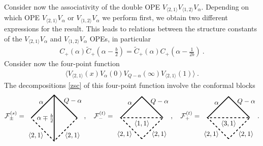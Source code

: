 \documentclass[12pt, a4paper, notitlepage, twoside]{report}
\numberwithin{equation}{section}
\theoremstyle{break}
\begin{document}
Consider now the associativity of the double OPE
$V_{\langle 2,1 \rangle}V_{\langle 1,2 \rangle}V_\alpha$.
Depending on which OPE $V_{\langle 2,1 \rangle}V_\alpha$ or $V_{\langle 1,2 \rangle}V_\alpha$ we perform first, we obtain two different expressions for the result.
This leads to 
relations between the structure constants of the $V_{\langle 2,1 \rangle}V_\alpha$ and $V_{\langle 1,2 \rangle}V_\alpha$ OPEs, in particular
\begin{align}
 C_+(\alpha)\tilde{C}_+(\alpha-\tfrac{b}{2}) = \tilde{C}_+(\alpha)C_+(\alpha-\tfrac{1}{2b})\ .
\label{ctc}
\end{align}
Consider now the four-point function
\begin{align}
 \Big\langle V_{\langle 2,1 \rangle}(x) V_\alpha(0) V_{Q-\alpha}(\infty) V_{\langle 2,1 \rangle}(1)\Big\rangle\ .
\label{zvv}
\end{align}
The decompositions \eqref{zsc} of this four-point function involve the conformal blocks
 \begin{align}
\mathcal{F}^{(s)}_\pm = 
\begin{tikzpicture}[baseline=(current  bounding  box.center), very thick, scale = .6]
\draw[dashed] (2, 0) -- node [below right] {\!\!\!$\langle 2,1 \rangle$} (0, -2) -- node [below left] {$\langle 2,1 \rangle$\!\!\!} (-2, 0); 
\draw (-2, 0) -- node [above left] {$\alpha$\!\!\!} (0, 2) -- node [above right] {\!\!\!\!$Q-\alpha$} (2, 0);
\draw (0, -2) -- node [left] {$\alpha\mp \frac{b}{2}\! \! $} (0, 2); 
\end{tikzpicture}
, \quad
 \mathcal{F}^{(t)}_-  =  
 \begin{tikzpicture}[baseline=(current  bounding  box.center), very thick, scale = .55]
\draw (-2, 0) -- node [above left] {$\alpha$\!\!\!} (0, 2) -- node [above right] {\!\!\!\!$Q-\alpha$} (2, 0);
\draw[dashed] (0, -2) -- node [below left] {$\langle 2,1 \rangle$\!\!\!} (-2, 0) -- node [below] {$\langle 1,1 \rangle$} (2, 0) -- node [below right] {\!\!\!$\langle 2,1 \rangle$} (0, -2); 
\end{tikzpicture}
, \quad
 \mathcal{F}^{(t)}_+  =  
 \begin{tikzpicture}[baseline=(current  bounding  box.center), very thick, scale = .55]
\draw (-2, 0) -- node [above left] {$\alpha$\!\!\!} (0, 2) -- node [above right] {\!\!\!\!$Q-\alpha$} (2, 0);
\draw[dashed] (0, -2) -- node [below left] {$\langle 2,1 \rangle$\!\!\!} (-2, 0) -- node [below] {$\langle 3,1 \rangle$} (2, 0) -- node [below right] {\!\!\!$\langle 2,1 \rangle$} (0, -2); 
\end{tikzpicture}
.
\end{align}
\end{document}
